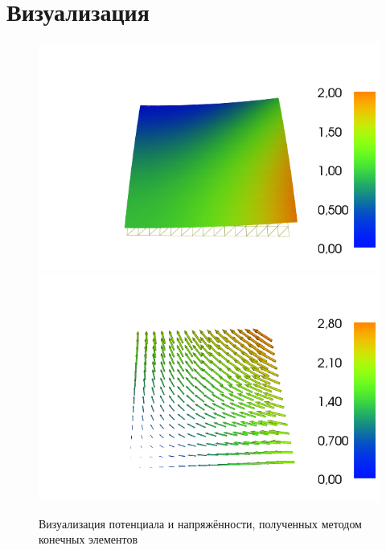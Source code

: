 \documentclass{report}
\begin{document}
\section{Визуализация}
\begin{figure}[h]
	\includegraphics[scale=0.4]{dolfin_plot_5.png}
	\includegraphics[scale=0.4]{dolfin_plot_4.png}
	\caption{Визуализация потенциала и напряжённости, полученных методом конечных элементов}
	\centering
\end{figure}
\end{document}
